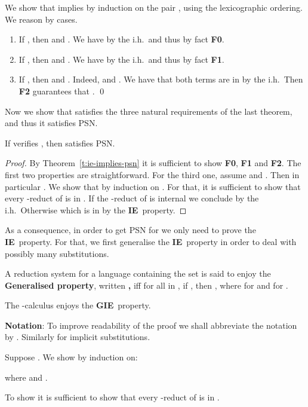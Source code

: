 \documentclass{LMCS}
\renewcommand{\>}{\rightarrow}
\newcommand{\ih}{i.h.}
\newcommand{\deft}[1]{{\bf #1}}
\newcommand{\iep}{{\bf IE}}
\newcommand{\giep}{{\bf GIE}}
\begin{document}
\proof
We show that  implies  by induction on
the pair , using the lexicographic
ordering. We reason by cases.
\begin{enumerate}[]
\item If , then  
and . We have 
 by the  \ih\ and thus   by fact {\bf F0}.
\item If , then  
and . 
We have 
 by the  \ih\ and thus   by fact {\bf F1}.
\item If , 
then  and . 
Indeed, 
and  . 
We have that 
both terms are in  by  the  \ih\
Then {\bf F2} guarantees that .
\qed
\end{enumerate}
Now we show that 
  satisfies the three natural requirements of the last
theorem, and thus it satisfies PSN.

\begin{lem}[Adequacy of ] 
\label{l:adequacy}
If  verifies , then  satisfies PSN.
\end{lem}

\begin{proof} By Theorem~\ref{t:ie-implies-psn} it is sufficient to
show {\bf F0}, {\bf F1} and {\bf F2}.  The first two properties are
  straightforward.  For the third one,  assume 
  and .
  Then in particular . We show that  by induction on .  For that, it is sufficient to show
  that every -reduct of  is in .  If the
  -reduct of  is internal we conclude by the \ih\ Otherwise
   which is in  by the
  \iep\ property.
\end{proof}



As a consequence, in order to get PSN for  we only need to prove 
the \iep\ property. For that, we first generalise
the \iep\ property in order to deal with  possibly many
substitutions.   


A reduction system  for a language  containing
  the set  is said to enjoy the \deft{Generalised  property}, written \deft{, } iff for
  all  in
  , if , then
  , where  for  and  for .  


\begin{thm}[ for ]
\label{t:ieg}
The -calculus enjoys the \giep\ property.
\end{thm}


\textbf{Notation}: To improve readability of the proof we shall
abbreviate the notation  by . Similarly for implicit substitutions.


\proof 
Suppose .
We show  by
induction on:

where
 and 
 .

To show  it is sufficient to show that
every -reduct of  is in . 
\end{document}
